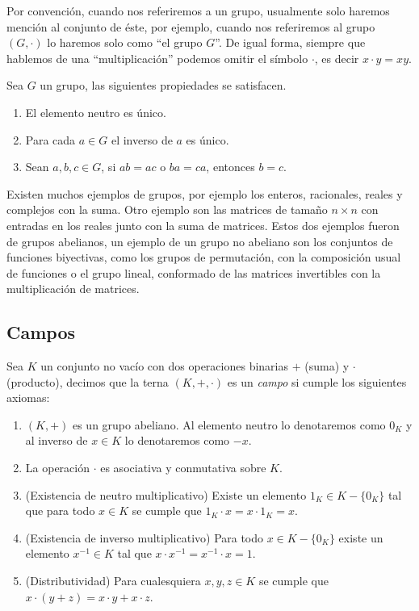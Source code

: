 Por convención, cuando nos referiremos a un grupo, usualmente solo haremos mención al conjunto de éste, por ejemplo, cuando nos referiremos al grupo $(G, \cdot)$ lo haremos solo como ``el grupo $G$''. De igual forma, siempre que hablemos de una ``multiplicación'' podemos omitir el símbolo $\cdot$, es decir $x \cdot y = xy$.

\begin{teor}
  Sea $G$ un grupo, las siguientes propiedades se satisfacen.
    \begin{enumerate}
      \item El elemento neutro es único.
      \item Para cada $a \in G$ el inverso de $a$ es único.
      \item Sean $a,b,c \in G$, si $ab=ac$ o $ba=ca$, entonces $b=c$.
    \end{enumerate}
\end{teor}

Existen muchos ejemplos de grupos, por ejemplo los enteros, racionales, reales y complejos con la suma. Otro ejemplo son las matrices de tamaño $n \times n$ con entradas en los reales junto con la suma de matrices. Estos dos ejemplos fueron de  grupos abelianos, un ejemplo de un grupo no abeliano son los conjuntos de funciones biyectivas, como los grupos de permutación, con la composición usual de funciones o el grupo lineal, conformado de las matrices invertibles con la multiplicación de matrices.

\subsection{Campos}

\begin{defi}
  Sea $K$ un conjunto no vacío con dos operaciones binarias $+$ (suma) y $\cdot$ (producto), decimos que la terna $(K, +, \cdot)$ es un \emph{campo} si cumple los siguientes axiomas:
  \begin{enumerate}
    \item $(K,+)$ es un grupo abeliano. Al elemento neutro lo denotaremos como $0_K$ y al inverso de $x \in K$ lo denotaremos como $-x$.
    \item La operación $\cdot$ es asociativa y conmutativa sobre $K$.
    \item (Existencia de neutro multiplicativo) Existe un elemento $1_K \in K-\{0_K\}$ tal que para todo $x \in K$ se cumple que $1_K\cdot x = x\cdot 1_K = x$.
    \item (Existencia de inverso multiplicativo) Para todo $x \in K-\{0_K\}$ existe un elemento $ x^{-1} \in K$ tal que $x \cdot x^{-1} = x^{-1} \cdot x = 1$.
    \item (Distributividad) Para cualesquiera $x, y, z \in K$ se cumple que $x \cdot (y + z) = x \cdot y + x \cdot z$.
  \end{enumerate}
\end{defi}


